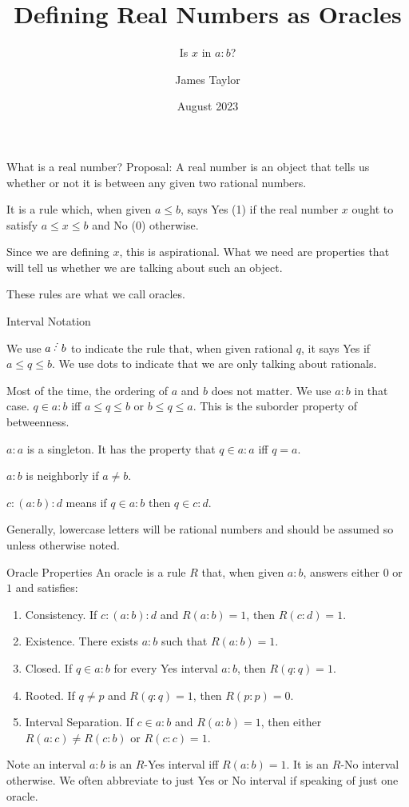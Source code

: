 \documentclass{beamer}
\title[Oracles]{Defining Real Numbers as Oracles}
\subtitle{\texorpdfstring{Is $x$ in $a:b$?}{Is x in a:b}}
\author{James Taylor}
\institute{ratmath.com}
\date{August 2023}
\begin{document}
\begin{frame}
\titlepage
\end{frame}


\begin{frame}{What is a real number?}
    Proposal: A real number is an object that tells us whether or not it is between any given two rational numbers. 

    It is a rule which, when given $a \leq b$, says Yes (1) if the real number $x$ ought to satisfy $a \leq x \leq b$ and No (0) otherwise. 

    Since we are defining $x$, this is aspirational. What we need are properties that will tell us whether we are talking about such an object. 

    These rules are what we call oracles. 
    
\end{frame}

\begin{frame}{Interval Notation}

    We use $a \lte b$ to indicate the rule that, when given rational $q$, it says Yes if  $a \leq q \leq b$. We use dots to indicate that we are only talking about rationals. 

    Most of the time, the ordering of $a$ and $b$ does not matter. We use $a : b$ in that case. $q \in a:b$ iff $a \leq q \leq b$ or $b \leq q \leq a$. This is the suborder property of betweenness. 

    $a:a$ is a singleton. It has the property that $q \in a:a$ iff $q = a$. 

    $a:b$ is neighborly if $a \neq b$.

    $c: (a:b) :d$ means if $q \in a:b$ then $q \in c:d$.

    Generally, lowercase letters will be rational numbers and should be assumed so unless otherwise noted. 
    
\end{frame}


\begin{frame}{Oracle Properties}
    An oracle is a rule $R$ that, when given $a:b$, answers either $0$ or $1$ and satisfies:
    \begin{enumerate}
    \item Consistency. If  $c: (a:b) : d$ and $R(a:b) = 1$, then $R(c:d) = 1$.
    \pause
    \item Existence. There exists $a:b$ such that $R(a:b) = 1$.
    \pause
    \item Closed. If $q \in a:b$ for every Yes interval $a:b$, then $R(q:q) = 1$. 
    \pause
    \item Rooted. If $q \neq p$ and $R(q:q) =1$, then $R(p:p) = 0$.
    \pause
    \item Interval Separation. If $c \in a:b$ and $R(a:b) = 1$, then either $R(a:c) \neq R(c:b)$ or $R(c:c) =1$.
    \end{enumerate}

    Note an interval $a:b$ is an $R$-Yes interval iff $R(a:b) = 1$. It is an $R$-No interval otherwise. We often abbreviate to just Yes or No interval if speaking of  just one oracle. 

\end{frame}
\end{document}
